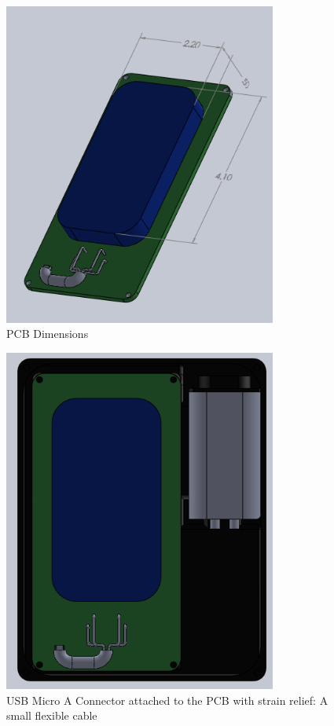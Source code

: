 \documentclass{article}
\numberwithin{figure}{section}
\numberwithin{equation}{section}
\begin{document}
{\begin{figure}[H]
	\centering
	\includegraphics[width=0.8\textwidth]{PhoneAndPCB}
	\caption{PCB Dimensions}
	\label{fig:append_pcbphone}
\end{figure}

\begin{figure}[H]
	\centering
	\includegraphics[width=0.8\textwidth]{Assembly1}
	\caption{USB Micro A Connector attached to the PCB with strain relief: A small flexible cable}
	\label{fig:append_usbcable}
\end{figure}

}
\end{document}
